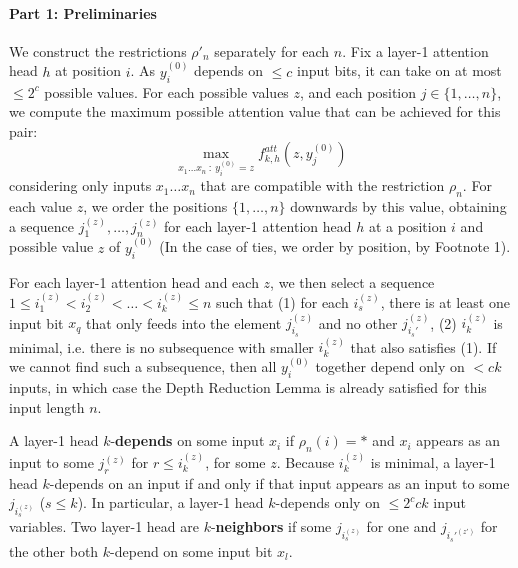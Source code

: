\documentclass[11pt,a4paper]{article}
\begin{document}
\paragraph{Part 1: Preliminaries}
We construct the restrictions $\rho'_n$ separately for each $n$.
Fix a layer-1 attention head $h$ at position $i$.
As $y^{(0)}_i$ depends on $\leq c$ input bits, it can take on at most $\leq 2^c$ possible values.
For each possible values $z$,  and each position $j \in \{1, \dots, n\}$, we compute the maximum possible attention value that can be achieved for this pair:
\begin{equation}
\max_{x_1\dots x_n\ :\ y^{(0)}_i=z} f^{att}_{k,h}(z, y^{(0)}_j)
\end{equation}
considering only inputs $x_1\dots x_n$ that are compatible with the restriction $\rho_n$.
For each value $z$, we order the positions $\{1, \dots, n\}$ downwards by this value, obtaining a sequence $j_1^{(z)}, \dots, j_n^{(z)}$ for each layer-1 attention head $h$ at a position $i$ and possible value $z$ of $y^{(0)}_i$ (In the case of ties, we order by  position, by Footnote 1).

For each layer-1 attention head and each $z$, we then select a sequence $1 \leq i_1^{(z)} < i_2^{(z)} < \dots < i_{k}^{(z)} \leq n$ such that (1) for each $i_s^{(z)}$, there is at least one input bit $x_q$ that only feeds into the element $j_{i_s}^{(z)}$ and no other $j_{i_s'}^{(z)}$, (2) $i_{k}^{(z)}$ is minimal, i.e. there is no subsequence with smaller $i_{k}^{(z)}$ that also satisfies (1).
If we cannot find such a subsequence, then all $y_i^{(0)}$ together depend only on $< ck$ inputs, in which case the Depth Reduction Lemma is already satisfied for this input length $n$.

A layer-1 head $k$-\textbf{depends} on some input $x_i$ if $\rho_n(i) = *$ and $x_i$ appears as an input to some $j_r^{(z)}$ for $r \leq i_k^{(z)}$, for some $z$.
Because $i_k^{(z)}$ is minimal, a layer-1 head $k$-depends on an input if and only if that input appears as an input to some $j_{i_s^{(z)}}$ ($s \leq k$).
In particular, a layer-1 head $k$-depends only on $\leq 2^c ck$ input variables.
Two layer-1 head are $k$-\textbf{neighbors} if some $j_{i_s^{(z)}}$ for one and $j_{i_s'^{(z')}}$ for the other both $k$-depend on some input bit $x_l$.
\end{document}
